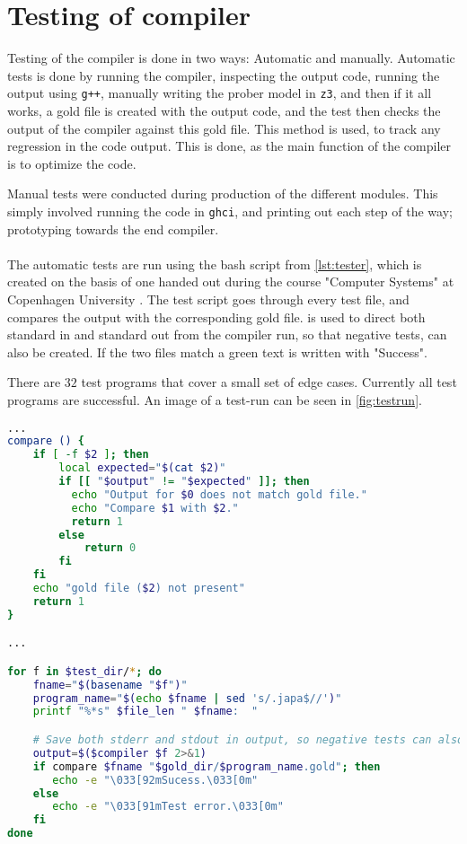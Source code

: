 \section{Testing of compiler } \label{sec:tests}
Testing of the compiler is done in two ways: Automatic and manually. Automatic tests is
done by running the compiler, inspecting the output code, running the output using \texttt{g++},
manually writing the prober model in \texttt{z3}, and then if it all works, a gold file is
created with the output code, and the test then checks the output of the compiler against this
gold file. This method is used, to track any regression in the code output. This is done, as
the main function of the compiler is to optimize the code.

Manual tests were conducted during production of the different modules. This simply involved
running the code in \texttt{ghci}, and printing out each step of the way; prototyping towards
the end compiler.
\\
\\
The automatic tests are run using the bash script from \autoref{lst:tester}, which is created
on the basis of one handed out during the course "Computer Systems" at Copenhagen University
\cite{compSys}. The test
script goes through every test \lan file, and compares the output with the corresponding
gold file.  is used to direct both standard in and standard out from the compiler
run, so that negative tests, can also be created. If the two files match a green text
is written with "Success".

There are $32$ test programs that cover a small set of edge cases. Currently all test programs
are successful. An image of a test-run can be seen in \autoref{fig:testrun}.


\begin{lstlisting}[language=Bash, label={lst:tester}]
...
compare () {
    if [ -f $2 ]; then
        local expected="$(cat $2)"
        if [[ "$output" != "$expected" ]]; then
          echo "Output for $0 does not match gold file."
          echo "Compare $1 with $2."
          return 1
        else
            return 0
        fi
    fi
    echo "gold file ($2) not present"
    return 1
}

...

for f in $test_dir/*; do
    fname="$(basename "$f")"
    program_name="$(echo $fname | sed 's/.japa$//')"
    printf "%*s" $file_len " $fname:  "

    # Save both stderr and stdout in output, so negative tests can also be tested
    output=$($compiler $f 2>&1)
    if compare $fname "$gold_dir/$program_name.gold"; then
       echo -e "\033[92mSucess.\033[0m"
    else
       echo -e "\033[91mTest error.\033[0m"
    fi
done
\end{lstlisting}